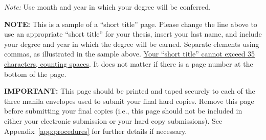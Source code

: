%
%
\begin{thesisauthorvita}
%
%

\end{thesisauthorvita}
{\flushleft
\textit{Note:} Use month and year in which your degree will be conferred.}

\begin{thesisshorttitlepage}
{\small 

\textbf{NOTE:}	This is a sample of a ``short title'' page.  Please change the
line above to use an appropriate ``short title'' for your thesis, insert your
last name, and include your degree and year in which the degree will be earned.
Separate elements using commas, as illustrated in the sample above.
\uline{Your ``short title'' cannot exceed 35 characters, counting spaces}.  It
does not matter if there is a page number at the bottom of the page.  

\textbf{IMPORTANT:} This page should be printed and taped securely to each of
the three manila envelopes used to submit your final hard copies.  Remove this
page before submitting your final copies (i.e., this page should not be
included in either your electronic submission or your hard copy submissions).
See Appendix~\ref{app:procedures} for further details if necessary.
}
\end{thesisshorttitlepage}

